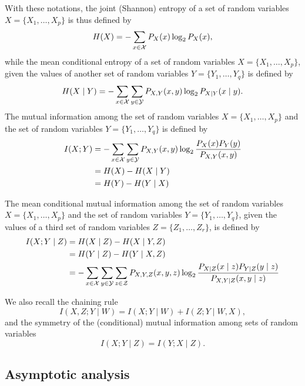 With these notations, the joint (Shannon) entropy of a set of random variables
$X =\{X_{1}, \ldots , X_{p}\}$ is thus defined by
\begin{equation}
H(X)  = - \sum_{x \in {\cal X}}P_{X} (x)\log_{2}P_{X }(x),
\end{equation}
while the mean conditional entropy of a set of random variables $X = \{X_{1},
\ldots , X_{p}\}$, given the values of another set of random variables
$Y=\{Y_{1}, \ldots , Y_{q}\}$ is defined by
\begin{equation}
H(X\mid Y) = - \sum_{x \in {\cal X}} \sum_{y \in {\cal Y}} P_{X, Y} (x, y) \log_{2} P_{X \mid Y} (x  \mid y).
 \end{equation}
The mutual information among the set of random variables $X =\{X_{1}, \ldots ,
X_{p}\}$ and the set of random variables $Y=\{Y_{1}, \ldots , Y_{q}\}$ is
defined by
 \begin{align}
 I(X; Y) &= - \sum_{x \in {\cal X}} \sum_{y \in {\cal Y}} P_{X, Y} (x, y) \log_{2} \frac{P_{X}(x) P_{Y}(y)}{P_{X,Y}(x,y)} \\
 &= H(X) - H(X \mid Y) \nonumber \\
 &=  H(Y) - H(Y \mid X) \nonumber
 \end{align}

The mean conditional mutual information among the set of random variables $X
=\{X_{1}, \ldots , X_{p}\}$ and the set of random variables $Y=\{Y_{1}, \ldots
, Y_{q}\}$, given the values of a third set of random variables $Z=\{Z_{1},
\ldots , Z_{r}\}$, is defined by
 \begin{align}
 I(X; Y \mid Z) &= H(X \mid Z) - H(X \mid Y, Z)\\
 & = H(Y \mid Z) - H(Y \mid X, Z) \nonumber\\
& = - \sum_{x \in {\cal X}} \sum_{y \in {\cal Y}} \sum_{z \in {\cal Z}} P_{X, Y, Z} (x, y, z) \log_{2} \frac{P_{X \mid Z}(x \mid z) P_{Y\mid Z}(y \mid z)}{P_{X,Y \mid Z}(x,y \mid z)}\nonumber
\end{align}

We also recall the chaining rule
\begin{equation}
I(X, Z ; Y \mid W ) = I(X; Y \mid W  ) + I( Z ; Y \mid W, X),
\end{equation}
and the symmetry of the (conditional) mutual information among sets of random variables
\begin{equation}
I(X ; Y \mid Z) = I(Y ;  X  \mid Z).
\end{equation}


\subsection{Asymptotic analysis}

